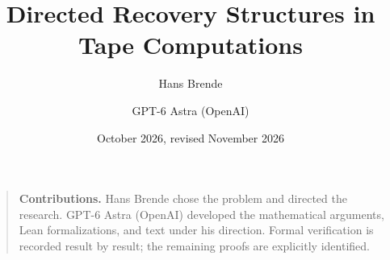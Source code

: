 \documentclass[11pt]{article}
\title{Directed Recovery Structures in Tape Computations}
\author{Hans Brende \and GPT-6 Astra (OpenAI)}
\date{October 2026, revised November 2026}
\numberwithin{equation}{section}
\begin{document}
\maketitle
\begin{abstract}

\end{abstract}

\begin{quote}\small
\textbf{Contributions.} Hans Brende chose the problem and directed the research.
GPT-6 Astra (OpenAI) developed the mathematical arguments, Lean
formalizations, and text under his direction. Formal verification
is recorded result by result; the remaining proofs are explicitly identified.
\end{quote}

\clearpage
\begingroup\small
\tableofcontents
\endgroup
\clearpage









\appendix







\end{document}
